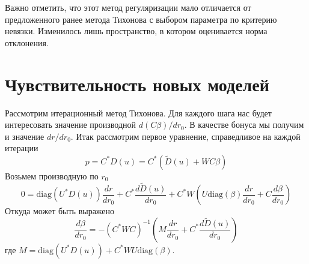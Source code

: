 \documentclass[10pt]{article}
\theoremstyle{definition}
\theoremstyle{remark}
\theoremstyle{plain}
\newcommand{\wt}{\widetilde}
\newcommand{\diag}{\mathrm{diag}}
\begin{document}
Важно отметить, что этот метод регуляризации мало отличается от предложенного ранее метода Тихонова с выбором параметра по критерию невязки. Изменилось лишь пространство, в котором оценивается норма отклонения.

\newpage
\section{Чувствительность новых моделей}
Рассмотрим итерационный метод Тихонова. Для каждого шага нас будет интересовать значение производной $d(C\beta)/dr_0$. В качестве бонуса мы получим и значение $dr/dr_0$. Итак рассмотрим первое уравнение, справедливое на каждой итерации
$$
p = C^*D(u) = C^*(\wt{D}(u) + WC\beta)
$$
Возьмем производную по $r_0$
$$
0 = \diag(U^*D(u))\frac{dr}{dr_0}+ C^*\frac{d\wt{D}(u)}{dr_0}+
C^*W\left(U\diag(\beta)\frac{dr}{dr_0} +C\frac{d\beta}{dr_0}\right)
$$
Откуда может быть выражено
$$
\frac{d\beta}{dr_0} = -(C^*WC)^{-1}\left(M\frac{dr}{dr_0}+ C^*\frac{d\wt{D}(u)}{dr_0}\right)
$$
где $M = \diag(U^*D(u))+C^*WU\diag(\beta)$.
\end{document}
